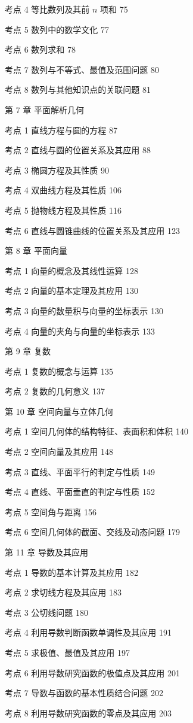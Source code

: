 考点 4 等比数列及其前 $n$ 项和 75

考点 5 数列中的数学文化 77

考点 6 数列求和 78

考点 7 数列与不等式、最值及范围问题 80

考点 8 数列与其他知识点的关联问题 81

第 7 章 平面解析几何

考点 1 直线方程与圆的方程 87

考点 2 直线与圆的位置关系及其应用 88

考点 3 椭圆方程及其性质 90

考点 4 双曲线方程及其性质 106

考点 5 抛物线方程及其性质 116

考点 6 直线与圆锥曲线的位置关系及其应用 123

第 8 章 平面向量

考点 1 向量的概念及其线性运算 128

考点 2 向量的基本定理及其应用 130

考点 3 向量的数量积与向量的坐标表示 130

考点 4 向量的夹角与向量的坐标表示 133

第 9 章 复数

考点 1 复数的概念与运算 135

考点 2 复数的几何意义 137

第 10 章 空间向量与立体几何

考点 1 空间几何体的结构特征、表面积和体积 140

考点 2 空间向量及其应用 148

考点 3 直线、平面平行的判定与性质 149

考点 4 直线、平面垂直的判定与性质 152

考点 5 空间角与距离 156

考点 6 空间几何体的截面、交线及动态问题 179

第 11 章 导数及其应用

考点 1 导数的基本计算及其应用 182

考点 2 求切线方程及其应用 183

考点 3 公切线问题 180

考点 4 利用导数判断函数单调性及其应用 191

考点 5 求极值、最值及其应用 197

考点 6 利用导数研究函数的极值点及其应用 201

考点 7 导数与函数的基本性质结合问题 202

考点 8 利用导数研究函数的零点及其应用 203

